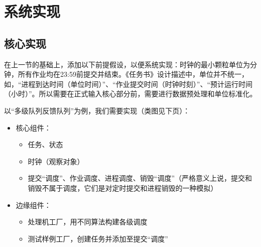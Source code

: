 \documentclass[UTF8]{ctexart}
\begin{document}
\section{系统实现}

\subsection{核心实现}
在上一节的基础上，添加以下前提假设，以便系统实现：时钟的最小颗粒单位为分钟，所有作业均在23:59前提交并结束。《任务书》设计描述中，单位并不统一，如，“进程到达时间（单位时间）”、“作业提交时间（时钟时刻）”、“预计运行时间（小时）”。所以需要在正式输入核心部分前，需要进行数据预处理和单位标准化。

以“多级队列反馈队列”为例，我们需要实现（类图见下页）：
\begin{itemize}
    \item 核心组件：
          \begin{itemize}
              \item 任务、状态
              \item 时钟（观察对象）
              \item 提交“调度”、作业调度、进程调度、销毁“调度”（严格意义上说，提交和销毁不属于调度，它们是对定时提交和进程销毁的一种模拟）
          \end{itemize}
    \item 边缘组件：
          \begin{itemize}
              \item 处理机工厂，用不同算法构建各级调度
              \item 测试样例工厂，创建任务并添加至提交“调度”
          \end{itemize}
\end{itemize}
\end{document}
